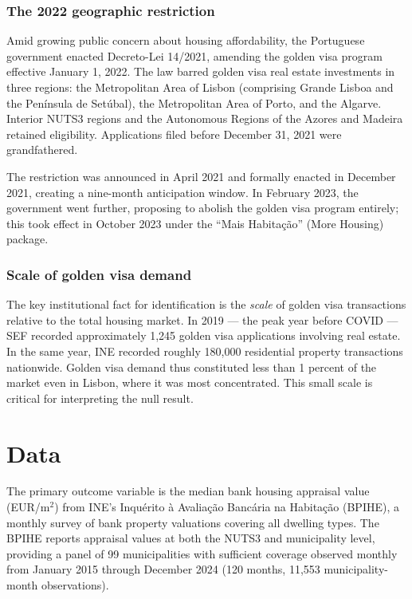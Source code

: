 \documentclass[12pt]{article}
\begin{document}
\subsubsection*{The 2022 geographic restriction} Amid growing public concern about housing affordability, the Portuguese government enacted Decreto-Lei 14/2021, amending the golden visa program effective January 1, 2022. The law barred golden visa real estate investments in three regions: the Metropolitan Area of Lisbon (comprising Grande Lisboa and the Pen\'{i}nsula de Set\'{u}bal), the Metropolitan Area of Porto, and the Algarve. Interior NUTS3 regions and the Autonomous Regions of the Azores and Madeira retained eligibility. Applications filed before December 31, 2021 were grandfathered.

The restriction was announced in April 2021 and formally enacted in December 2021, creating a nine-month anticipation window. In February 2023, the government went further, proposing to abolish the golden visa program entirely; this took effect in October 2023 under the ``Mais Habita\c{c}\~{a}o'' (More Housing) package.

\subsubsection*{Scale of golden visa demand} The key institutional fact for identification is the \textit{scale} of golden visa transactions relative to the total housing market. In 2019 --- the peak year before COVID --- SEF recorded approximately 1,245 golden visa applications involving real estate. In the same year, INE recorded roughly 180,000 residential property transactions nationwide. Golden visa demand thus constituted less than 1 percent of the market even in Lisbon, where it was most concentrated. This small scale is critical for interpreting the null result.


\section{Data}

The primary outcome variable is the median bank housing appraisal value (EUR/m$^2$) from INE's Inqu\'{e}rito \`{a} Avalia\c{c}\~{a}o Banc\'{a}ria na Habita\c{c}\~{a}o (BPIHE), a monthly survey of bank property valuations covering all dwelling types. The BPIHE reports appraisal values at both the NUTS3 and municipality level, providing a panel of 99 municipalities with sufficient coverage observed monthly from January 2015 through December 2024 (120 months, 11,553 municipality-month observations).
\end{document}
